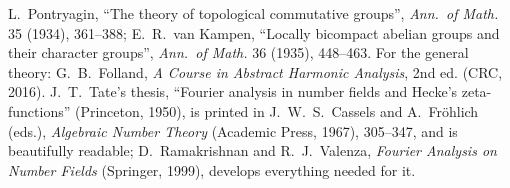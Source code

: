 L.~Pontryagin, ``The theory of topological commutative groups'', \emph{Ann.\ of Math.} 35 (1934), 361--388; E.~R.~van Kampen, ``Locally bicompact abelian groups and their character
groups'', \emph{Ann.\ of Math.} 36 (1935), 448--463. For the general theory: G.~B.~Folland, \emph{A Course in Abstract Harmonic Analysis}, 2nd ed. (CRC, 2016). J.~T.~Tate's thesis,
``Fourier analysis in number fields and Hecke's zeta-functions'' (Princeton, 1950), is printed in J.~W.~S.~Cassels and A.~Fr\"ohlich (eds.), \emph{Algebraic Number Theory}
(Academic Press, 1967), 305--347, and is beautifully readable; D.~Ramakrishnan and R.~J.~Valenza, \emph{Fourier Analysis on Number Fields} (Springer, 1999), develops everything
needed for it.
